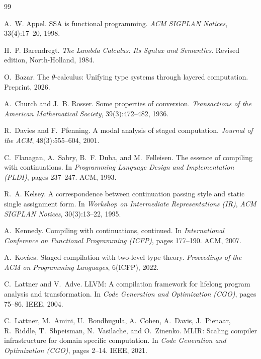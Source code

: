 \documentclass[11pt,letterpaper]{article}
\newcounter{pt}
\begin{document}

\begin{thebibliography}{99}

A.~W. Appel.
SSA is functional programming.
\textit{ACM SIGPLAN Notices}, 33(4):17--20, 1998.

H.~P. Barendregt.
\textit{The Lambda Calculus: Its Syntax and Semantics}.
Revised edition, North-Holland, 1984.

O.~Bazar.
The $\theta$-calculus: Unifying type systems through layered computation.
Preprint, 2026.

A.~Church and J.~B. Rosser.
Some properties of conversion.
\textit{Transactions of the American Mathematical Society}, 39(3):472--482, 1936.

R.~Davies and F.~Pfenning.
A modal analysis of staged computation.
\textit{Journal of the ACM}, 48(3):555--604, 2001.

C.~Flanagan, A.~Sabry, B.~F. Duba, and M.~Felleisen.
The essence of compiling with continuations.
In \textit{Programming Language Design and Implementation (PLDI)},
pages 237--247. ACM, 1993.

R.~A. Kelsey.
A correspondence between continuation passing style and static single
assignment form.
In \textit{Workshop on Intermediate Representations (IR)},
\textit{ACM SIGPLAN Notices}, 30(3):13--22, 1995.

A.~Kennedy.
Compiling with continuations, continued.
In \textit{International Conference on Functional Programming (ICFP)},
pages 177--190. ACM, 2007.

A.~Kov\'{a}cs.
Staged compilation with two-level type theory.
\textit{Proceedings of the ACM on Programming Languages}, 6(ICFP), 2022.

C.~Lattner and V.~Adve.
LLVM: A compilation framework for lifelong program analysis and
transformation.
In \textit{Code Generation and Optimization (CGO)}, pages 75--86. IEEE, 2004.

C.~Lattner, M.~Amini, U.~Bondhugula, A.~Cohen, A.~Davis, J.~Pienaar,
R.~Riddle, T.~Shpeisman, N.~Vasilache, and O.~Zinenko.
MLIR: Scaling compiler infrastructure for domain specific computation.
In \textit{Code Generation and Optimization (CGO)}, pages 2--14. IEEE, 2021.


\end{thebibliography}
\end{document}
